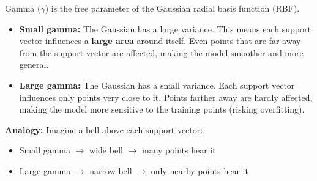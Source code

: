 
Gamma ($\gamma$) is the free parameter of the Gaussian radial basis function (RBF).

\begin{itemize}
    \item \textbf{Small gamma:} The Gaussian has a large variance.  
    This means each support vector influences a \textbf{large area} around itself.  
    Even points that are far away from the support vector are affected, making the model smoother and more general.
    
    \item \textbf{Large gamma:} The Gaussian has a small variance.  
    Each support vector influences only points very close to it.  
    Points farther away are hardly affected, making the model more sensitive to the training points (risking overfitting).
\end{itemize}

\textbf{Analogy:} Imagine a bell above each support vector:
\begin{itemize}
    \item Small gamma $\rightarrow$ wide bell $\rightarrow$ many points hear it
    \item Large gamma $\rightarrow$ narrow bell $\rightarrow$ only nearby points hear it
\end{itemize}
